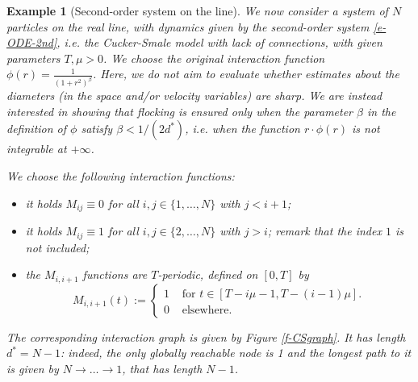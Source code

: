 \documentclass[journal]{article}
\newtheorem{example}{Example}
\begin{document}
\begin{example}[Second-order system on the line]\label{ex-2} We now consider a system of $N$ particles on the real line, with dynamics given by the second-order system \ref{e-ODE-2nd}, i.e. the Cucker-Smale model with lack of connections, with given parameters $T,\mu>0$. We choose the original interaction function $\phi(r)=\frac{1}{(1+r^2)^{\beta}}$. Here, we do not aim to evaluate whether estimates about the diameters (in the space and/or velocity variables) are sharp. We are instead interested in showing that flocking is ensured only when the parameter $\beta$ in the definition of $\phi$ satisfy $\beta<1/(2d^*)$, i.e. when the function $r\cdot \phi(r)$ is not integrable at $+\infty$.

We choose the following interaction functions:
\begin{itemize}
\item it holds $M_{ij}\equiv 0$ for all $i,j\in\{1,\ldots,N\}$ with $j<i+1$;
\item it holds $M_{ij}\equiv 1$ for all $i,j\in\{2,\ldots,N\}$ with $j>i$; remark that the index $1$ is not included;
\item the $M_{i,i+1}$ functions are $T$-periodic, defined on $[0,T]$ by
\begin{equation}M_{i,i+1}(t):=\begin{cases}
1&\mbox{~for $t\in [T-i\mu-1,T-(i-1)\mu]$.}\\
0&\mbox{~elsewhere.}
\end{cases}\label{e-Mex2}
\end{equation}
\end{itemize}
 The corresponding interaction graph is given by Figure \ref{f-CSgraph}. It has length $d^*=N-1$: indeed, the only globally reachable node is 1 and the longest path to it is given by $N\to\ldots\to 1$, that has length $N-1$.

 \begin{figure}
\centering
{} %

\begin{tikzpicture}[x=0.75pt,y=0.75pt,yscale=-1,xscale=1]


\end{tikzpicture}
\end{figure}
\end{example}
\end{document}
